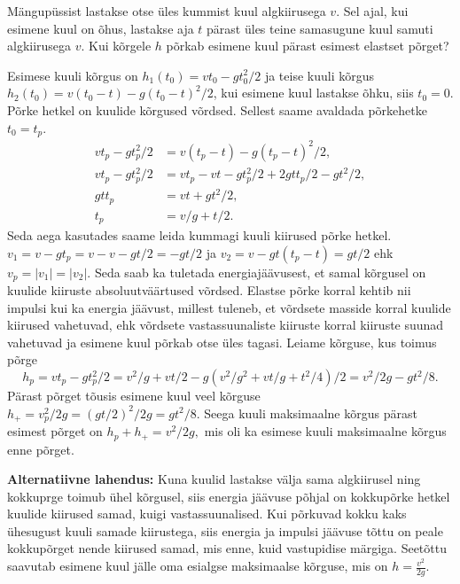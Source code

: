 
Mängupüssist lastakse otse üles kummist kuul algkiirusega $v$. Sel ajal, kui esimene kuul on õhus, lastakse aja $t$ pärast üles teine samasugune kuul samuti algkiirusega $v$. Kui kõrgele $h$ põrkab esimene kuul pärast esimest elastset põrget?


\hint

\solu
Esimese kuuli kõrgus on \(h_1(t_0) = vt_0 - gt_0^2/2\) ja teise kuuli kõrgus \(h_2(t_0) = v(t_0-t) - g(t_0 - t)^2/2\), kui esimene kuul lastakse õhku, siis \(t_0 = 0\). Põrke hetkel on kuulide kõrgused võrdsed. Sellest saame avaldada põrkehetke \(t_0 = t_p\).
\begin{align*}
    vt_p - gt_p^2/2 &= v(t_p-t) - g(t_p -t)^2/2, \\
    vt_p - gt_p^2/2 &= vt_p - vt - gt_p^2/2 + 2gtt_p/2 - gt^2/2,\\
    gtt_p &= vt + gt^2/2, \\
    t_p &= v/g + t/2.
\end{align*}
Seda aega kasutades saame leida kummagi kuuli kiirused põrke hetkel. \(v_1 = v - gt_p = v - v - gt/2 = -gt/2\) ja \(v_2 = v -gt(t_p-t) = gt/2\) ehk \(v_p = |v_1| = |v_2|\). Seda saab ka tuletada energiajäävusest, et samal kõrgusel on kuulide kiiruste absoluutväärtused võrdsed. Elastse põrke korral kehtib nii impulsi kui ka energia jäävust, millest tuleneb, et võrdsete masside korral kuulide kiirused vahetuvad, ehk võrdsete vastassuunaliste kiiruste korral kiiruste suunad vahetuvad ja esimene kuul põrkab otse üles tagasi. Leiame kõrguse, kus toimus põrge
\[h_p = vt_p - gt_p^2/2 = v^2/g + vt/2 - g(v^2/g^2 + vt/g + t^2/4)/2 = v^2/2g - gt^2/8.\]
Pärast põrget tõusis esimene kuul veel kõrguse \(h_+ = v_p^2/2g = (gt/2)^2/2g = gt^2/8.\) Seega kuuli maksimaalne kõrgus pärast esimest põrget on \(h_p + h_+ = v^2/2g,\) mis oli ka esimese kuuli maksimaalne kõrgus enne põrget.

\textbf{Alternatiivne lahendus:} Kuna kuulid lastakse välja sama algkiirusel ning kokkuprge toimub ühel kõrgusel, siis energia jäävuse põhjal on kokkupõrke hetkel kuulide kiirused samad, kuigi vastassuunalised. Kui põrkuvad kokku kaks ühesugust kuuli samade kiirustega, siis energia ja impulsi jäävuse tõttu on peale kokkupõrget nende kiirused samad, mis enne, kuid vastupidise märgiga. Seetõttu saavutab esimene kuul jälle oma esialgse maksimaalse kõrguse, mis on $h=\frac{v^2}{2g}$.
\probend